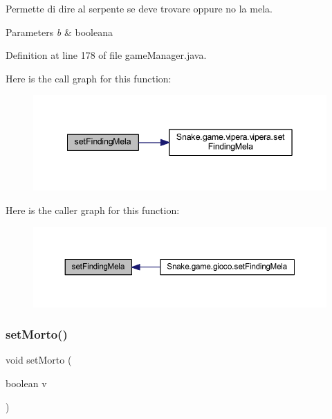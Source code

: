 Permette di dire al serpente se deve trovare oppure no la mela. 


\begin{DoxyParams}{Parameters}
{\em b} & booleana \\
\hline
\end{DoxyParams}


Definition at line 178 of file game\+Manager.\+java.

Here is the call graph for this function\+:
\nopagebreak
\begin{figure}[H]
\begin{center}
\leavevmode
\includegraphics[width=342pt]{class_snake_1_1game_1_1utility_1_1game_manager_a169584b55e994918baf671fe1c741e39_cgraph}
\end{center}
\end{figure}
Here is the caller graph for this function\+:
\nopagebreak
\begin{figure}[H]
\begin{center}
\leavevmode
\includegraphics[width=350pt]{class_snake_1_1game_1_1utility_1_1game_manager_a169584b55e994918baf671fe1c741e39_icgraph}
\end{center}
\end{figure}
\mbox{\label{class_snake_1_1game_1_1utility_1_1game_manager_a05b55f5dcc088b5655c5ff77c01f37ea}} 
\subsubsection{\texorpdfstring{set\+Morto()}{setMorto()}}
{\footnotesize\ttfamily void set\+Morto (\begin{DoxyParamCaption}\item[{boolean}]{v }\end{DoxyParamCaption})}



